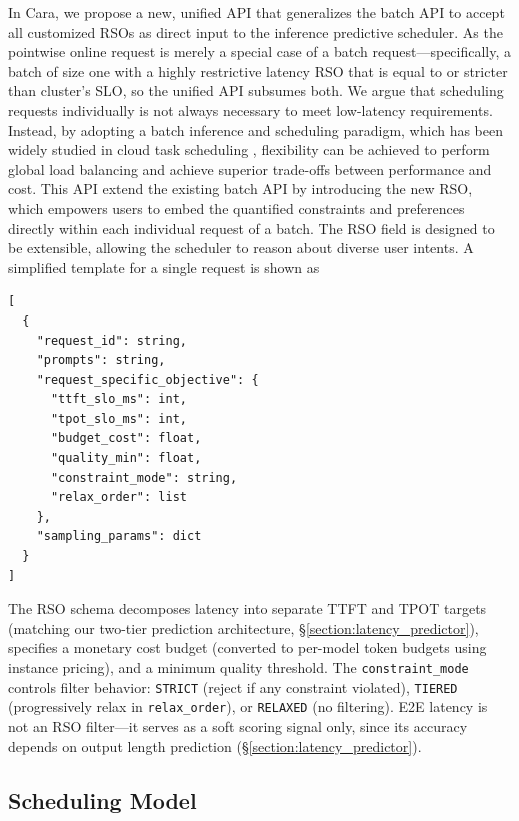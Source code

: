 \documentclass[letterpaper, anonymous, twocolumn, 10pt]{article}
\begin{document}
In Cara, we propose a new, unified API that generalizes the batch API to accept all customized RSOs as direct input to the inference predictive scheduler. As the pointwise online request is merely a special case of a batch request—specifically, a batch of size one with a highly restrictive latency RSO that is equal to or stricter than cluster's SLO, so the unified API subsumes both. We argue that scheduling requests individually is not always necessary to meet low-latency requirements. Instead, by adopting a batch inference and scheduling paradigm, which has been widely studied in cloud task scheduling \cite{eva-eurosys}, flexibility can be achieved to perform global load balancing and achieve superior trade-offs between performance and cost.  This API extend the existing batch API by introducing the new RSO, which empowers users to embed the quantified constraints and preferences directly within each individual request of a batch. The RSO field is designed to be extensible, allowing the scheduler to reason about diverse user intents. A simplified template for a single request is shown as
\begin{minipage}{\linewidth}
\begin{lstlisting}[style=jsonstyle, caption={Schema for Generate API request with RSOs.}, label={lst:api_schema}]
[
  {
    "request_id": string,
    "prompts": string,
    "request_specific_objective": {
      "ttft_slo_ms": int,
      "tpot_slo_ms": int,
      "budget_cost": float,
      "quality_min": float,
      "constraint_mode": string,
      "relax_order": list
    },
    "sampling_params": dict
  }
]
\end{lstlisting}
\end{minipage}
The RSO schema decomposes latency into separate TTFT and TPOT targets (matching our two-tier prediction architecture, \S\ref{section:latency_predictor}), specifies a monetary cost budget (converted to per-model token budgets using instance pricing), and a minimum quality threshold.
The \texttt{constraint\_mode} controls filter behavior: \texttt{STRICT} (reject if any constraint violated), \texttt{TIERED} (progressively relax in \texttt{relax\_order}), or \texttt{RELAXED} (no filtering).
E2E latency is not an RSO filter---it serves as a soft scoring signal only, since its accuracy depends on output length prediction (\S\ref{section:latency_predictor}).

\subsection{Scheduling Model} \label{section:system_model}
\end{document}
